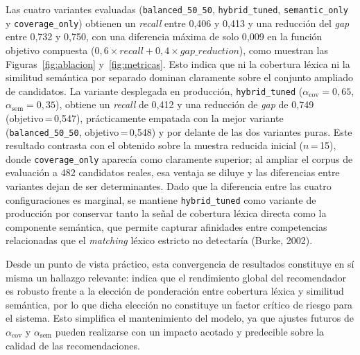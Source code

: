 Las cuatro variantes evaluadas (\texttt{balanced\_50\_50}, \texttt{hybrid\_tuned}, \texttt{semantic\_only} y \texttt{coverage\_only}) obtienen un \textit{recall} entre 0,406 y 0,413 y una reducción del \textit{gap} entre 0,732 y 0,750, con una diferencia máxima de solo 0,009 en la función objetivo compuesta ($0{,}6 \times \textit{recall} + 0{,}4 \times \textit{gap\_reduction}$), como muestran las Figuras~\ref{fig:ablacion} y~\ref{fig:metricas}. Esto indica que ni la cobertura léxica ni la similitud semántica por separado dominan claramente sobre el conjunto ampliado de candidatos. La variante desplegada en producción, \texttt{hybrid\_tuned} ($\alpha_{\text{cov}}=0{,}65$, $\alpha_{\text{sem}}=0{,}35$), obtiene un \textit{recall} de 0,412 y una reducción de \textit{gap} de 0,749 (objetivo\,=\,0,547), prácticamente empatada con la mejor variante (\texttt{balanced\_50\_50}, objetivo\,=\,0,548) y por delante de las dos variantes puras. Este resultado contrasta con el obtenido sobre la muestra reducida inicial ($n$\,=\,15), donde \texttt{coverage\_only} aparecía como claramente superior; al ampliar el corpus de evaluación a 482 candidatos reales, esa ventaja se diluye y las diferencias entre variantes dejan de ser determinantes. Dado que la diferencia entre las cuatro configuraciones es marginal, se mantiene \texttt{hybrid\_tuned} como variante de producción por conservar tanto la señal de cobertura léxica directa como la componente semántica, que permite capturar afinidades entre competencias relacionadas que el \textit{matching} léxico estricto no detectaría (Burke, 2002).

Desde un punto de vista práctico, esta convergencia de resultados constituye en sí misma un hallazgo relevante: indica que el rendimiento global del recomendador es robusto frente a la elección de ponderación entre cobertura léxica y similitud semántica, por lo que dicha elección no constituye un factor crítico de riesgo para el sistema. Esto simplifica el mantenimiento del modelo, ya que ajustes futuros de $\alpha_{\text{cov}}$ y $\alpha_{\text{sem}}$ pueden realizarse con un impacto acotado y predecible sobre la calidad de las recomendaciones.

